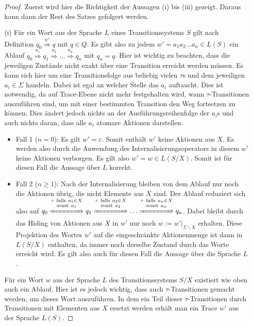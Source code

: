 \begin{proof}
  Zuerst wird hier die Richtigkeit der Aussagen (i) bis (iii) gezeigt. Daraus
  kann dann der Rest des Satzes gefolgert werden.

  (i)
  Für ein Wort aus der Sprache $L$ eines Transitionssystems $S$ gilt nach
  Definition $q_0 \overset{w'}{\Rightarrow} q$ mit $q\in Q$. Es gibt also zu
  jedem $w' = a_1a_2\dots a_n\in L(S)$ ein Ablauf $q_0
  \overset{a_1}{\Rightarrow} q_1 \overset{a_2}{\Rightarrow} \dots
  \overset{a_n}{\Rightarrow} q_n$ mit $q_n=q$. Hier ist wichtig zu beachten,
  dass die jeweiligen Zustände nicht exakt über eine Transition erreicht werden
  müssen. Es kann sich hier um eine Transitionsfolge aus beliebig vielen
  $\tau$s und dem jeweiligen $a_i\in\Sigma$ handeln. Dabei ist egal an welcher
  Stelle das $a_i$ auftaucht. Dies ist notwendig, da auf Trace-Ebene nicht mehr
  festgehalten wird, wann $\tau$-Transitionen auszuführen sind, um mit einer
  bestimmten Transition den Weg fortsetzen zu können. Dies ändert jedoch nichts
  an der Ausführungsreihenfolge der $a_i$s und auch nichts
  daran, dass alle $a_i$ atomare Aktionen darstellen.
  \begin{itemize}
    \item Fall 1 ($n=0$): Es gilt $w'=\varepsilon$. Somit enthält $w'$ keine
      Aktionen aus $X$. Es werden also durch die Anwendung des
      Internalisierungsoperators in diesem $w'$ keine Aktionen verborgen. Es
      gilt also $w'=w\in L(S/X)$. Somit ist für diesen Fall die Aussage über
      $L$ korrekt.
    \item Fall 2 ($n\geq 1$): Nach der Internalisierung bleiben von dem Ablauf
      nur noch die Aktionen übrig, die nicht Elemente aus $X$ sind. Der Ablauf
      reduziert sich also auf $q_0 \overset{\tau~\mathrm{falls}~a_1\in
      X}{\overset{\mathrm{sonst}~a_1}{\xRightarrow{\hspace{1.5cm}}}} q_1
      \overset{\tau~\mathrm{falls}~a_2\in
      X}{\overset{\mathrm{sonst}~a_2}{\xRightarrow{\hspace{1.5cm}}}} \dots
      \overset{\tau~\mathrm{falls}~a_n\in
      X}{\overset{\mathrm{sonst}~a_n}{\xRightarrow{\hspace{1.5cm}}}} q_n$. Dabei bleibt
      durch das Hiding von Aktionen aus $X$ in $w'$ nur noch
      $w:=w'|_{\Sigma\backslash X}$ erhalten. Diese Projektion des Wortes
      $w'$ auf die eingeschränkte Aktionenmenge ist dann in $L(S/X)$ enthalten,
      da immer noch derselbe Zustand durch das Worte erreicht wird. Es gilt
      also auch für diesen Fall die Aussage über die Sprache $L$.
  \end{itemize}
  Für ein Wort $w$ aus der Sprache $L$ des Transitionssystems $S/X$ existiert
  wie oben auch ein Ablauf. Hier ist es jedoch wichtig, dass auch
  $\tau$-Transitionen gemacht werden, um dieses Wort auszuführen. In dem ein
  Teil dieser $\tau$-Transitionen durch Transitionen mit Elementen aus $X$
  ersetzt werden erhält man ein Trace $w'$ aus der Sprache $L(S)$.


\end{proof}
